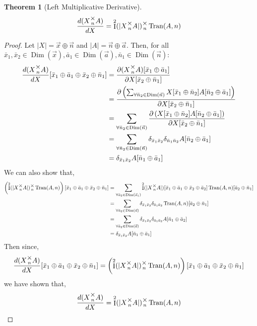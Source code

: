 \documentclass[12pt]{article}
\theoremstyle{definition}
\theoremstyle{plain}
\newtheorem{theorem}{Theorem}[section]
\theoremstyle{ppart}
\DeclareMathOperator{\Dim}{Dim}
\DeclareMathOperator{\Ident}{I}
\DeclareMathOperator{\Tran}{Tran}
\newcommand{\mmult}[1]{\text{\raisebox{1ex}{$\underset{#1}{\times}$}}}
\begin{document}
\begin{landscape}
\begin{theorem}[Left Multiplicative Derivative]
\label{left_mult_derivative}
\[ \frac{d(X \mmult{n} A)}{dX} = \Ident^2(|X \mmult{n} A|) \mmult{n} \Tran(A, n) \]
\end{theorem}
\begin{proof}
Let $|X| = \vec{x} \oplus \vec{n}$ and $|A| = \vec{n} \oplus \vec{a}$. Then,
for all
$\bar{x}_1, \bar{x}_2 \in \Dim(\vec{x}), \bar{a}_1 \in \Dim(\vec{a}),
\bar{n}_1 \in \Dim(\vec{n}):$
\begin{align*}
	\frac{d(X \mmult{n} A)}{dX}
	[\bar{x}_1 \oplus \bar{a}_1 \oplus \bar{x}_2 \oplus \bar{n}_1]
	&= 
	\frac{
		\partial (X \mmult{n} A) [\bar{x}_1 \oplus \bar{a}_1]
	}{\partial X[\bar{x}_2 \oplus \bar{n}_1]} \\
	&= 
	\frac{
		\partial \left(
			\sum_{\forall \bar{n}_2 \in \Dim(\vec{n})}
			X[\bar{x}_1 \oplus \bar{n}_2] A[\bar{n}_2 \oplus \bar{a}_1]
		\right)
	}{\partial X[\bar{x}_2 \oplus \bar{n}_1]} \\
	&= 
	\sum_{\forall \bar{n}_2 \in \Dim(\vec{n})}
	\frac{
		\partial \left(
			X[\bar{x}_1 \oplus \bar{n}_2] A[\bar{n}_2 \oplus \bar{a}_1]
		\right)
	}{\partial X[\bar{x}_2 \oplus \bar{n}_1]} \\
	&= 
	\sum_{\forall \bar{n}_2 \in \Dim(\vec{n})}
	\delta_{\bar{x}_1\bar{x}_2}
	\delta_{\bar{n}_1\bar{n}_2}
	A[\bar{n}_2 \oplus \bar{a}_1] \\
	&= 
	\delta_{\bar{x}_1\bar{x}_2}
	A[\bar{n}_1 \oplus \bar{a}_1]
\end{align*}
We can also show that,
\begin{align*}
	\left(\Ident^2(|X \mmult{n} A|) \mmult{n} \Tran(A, n)\right)
	[\bar{x}_1 \oplus \bar{a}_1 \oplus \bar{x}_2 \oplus \bar{n}_1]
	&=
	\sum_{\forall \bar{a}_2 \in \Dim(\vec{a}_1)}
	\Ident^2(|X \mmult{n} A|)[\bar{x}_1 \oplus \bar{a}_1 \oplus \bar{x}_2 \oplus \bar{a}_2]
	\Tran(A, n)[\bar{a}_2 \oplus \bar{n}_1] \\
	&=
	\sum_{\forall \bar{a}_2 \in \Dim(\vec{a})}
	\delta_{\bar{x}_1 \bar{x}_2} \delta_{\bar{a}_1 \bar{a}_2}
	\Tran(A, n)[\bar{a}_2 \oplus \bar{n}_1] \\
	&=
	\sum_{\forall \bar{a}_2 \in \Dim(\vec{a})}
	\delta_{\bar{x}_1 \bar{x}_2} \delta_{\bar{a}_1 \bar{a}_2}
	A[\bar{n}_1 \oplus \bar{a}_2] \\
	&=
	\delta_{\bar{x}_1 \bar{x}_2}
	A[\bar{n}_1 \oplus \bar{a}_1]
\end{align*}
Then since,
\[
	\frac{d(X \mmult{n} A)}{dX}
	[\bar{x}_1 \oplus \bar{a}_1 \oplus \bar{x}_2 \oplus \bar{n}_1]
	=
	\left(\Ident^2(|X \mmult{n} A|) \mmult{n} \Tran(A, n)\right)
	[\bar{x}_1 \oplus \bar{a}_1 \oplus \bar{x}_2 \oplus \bar{n}_1]
\]
we have shown that,
\[
	\frac{d(X \mmult{n} A)}{dX}
	=
	\Ident^2(|X \mmult{n} A|) \mmult{n} \Tran(A, n)
\]
\end{proof}
\end{landscape}
\end{document}
